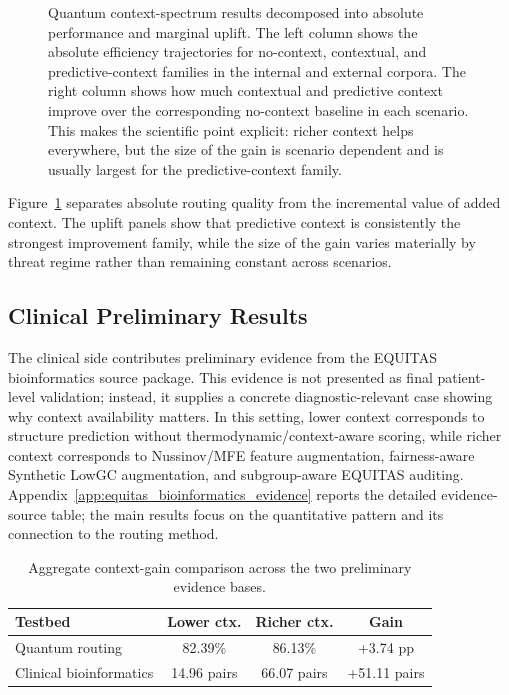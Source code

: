 \documentclass[conference]{IEEEtran}
\begin{document}
\begin{figure}[t]
\caption{Quantum context-spectrum results decomposed into absolute performance and marginal uplift. The left column shows the absolute efficiency trajectories for no-context, contextual, and predictive-context families in the internal and external corpora. The right column shows how much contextual and predictive context improve over the corresponding no-context baseline in each scenario. This makes the scientific point explicit: richer context helps everywhere, but the size of the gain is scenario dependent and is usually largest for the predictive-context family.}
\label{fig:context_spectrum}
\end{figure}

Figure~\ref{fig:context_spectrum} separates absolute routing quality from the incremental value of added context. The uplift panels show that predictive context is consistently the strongest improvement family, while the size of the gain varies materially by threat regime rather than remaining constant across scenarios.

\subsection{Clinical Preliminary Results}
The clinical side contributes preliminary evidence from the EQUITAS
bioinformatics source package. This evidence is not presented as final
patient-level validation; instead, it supplies a concrete diagnostic-relevant
case showing why context availability matters. In this setting, lower context
corresponds to structure prediction without thermodynamic/context-aware scoring,
while richer context corresponds to Nussinov/MFE feature augmentation,
fairness-aware Synthetic LowGC augmentation, and subgroup-aware EQUITAS auditing.
Appendix~\ref{app:equitas_bioinformatics_evidence} reports the detailed
evidence-source table; the main results focus on the quantitative pattern and
its connection to the routing method.

\begin{table}[t]
\caption{Aggregate context-gain comparison across the two preliminary evidence bases.}
\label{tab:cross_testbed_context_gain}
\centering
\small
\setlength{\tabcolsep}{4pt}
\begin{tabular}{p{}ccc}
\toprule
\textbf{Testbed} & \textbf{Lower ctx.} & \textbf{Richer ctx.} & \textbf{Gain} \\
\midrule
Quantum routing & 82.39\% & 86.13\% & +3.74 pp \\
Clinical bioinformatics & 14.96 pairs & 66.07 pairs & +51.11 pairs \\
\bottomrule
\end{tabular}
\end{table}
\end{document}
